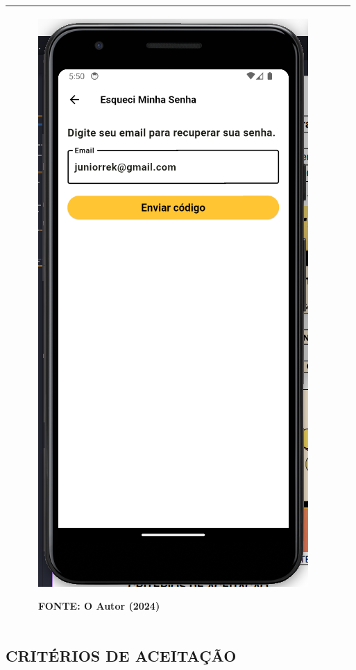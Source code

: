 \begin{tabular}{|ll|}
\begin{minipage}{0.48\textwidth}
\begin{figure}[H]
\includegraphics[width=.8\textwidth]{fig/telas/t_esqueci.png}
\footnotesize \centering
\par FONTE: O Autor (2024)
\end{figure}
\end{minipage}
 \\ \hline
\end{tabular}

\subsection*{\textbf{CRITÉRIOS DE ACEITAÇÃO}}

